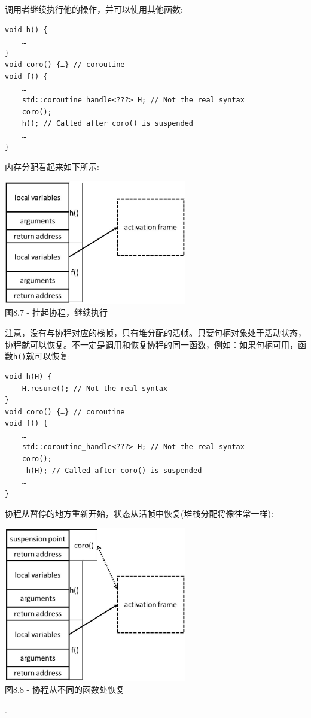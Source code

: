 调用者继续执行他的操作，并可以使用其他函数:

\begin{lstlisting}[style=styleCXX]
void h() {
	…
}
void coro() {…} // coroutine
void f() {
	…
	std::coroutine_handle<???> H; // Not the real syntax
	coro();
	h(); // Called after coro() is suspended
	…
}
\end{lstlisting}

内存分配看起来如下所示:

\begin{center}
\includegraphics[width=0.6\textwidth]{content/2/chapter8/images/7.jpg}\\
图8.7 - 挂起协程，继续执行
\end{center}

注意，没有与协程对应的栈帧，只有堆分配的活帧。只要句柄对象处于活动状态，协程就可以恢复。不一定是调用和恢复协程的同一函数，例如：如果句柄可用，函数\texttt{h()}就可以恢复:

\begin{lstlisting}[style=styleCXX]
void h(H) {
	H.resume(); // Not the real syntax
}
void coro() {…} // coroutine
void f() {
	…
	std::coroutine_handle<???> H; // Not the real syntax
	coro();
	 h(H); // Called after coro() is suspended
	…
}
\end{lstlisting}

协程从暂停的地方重新开始，状态从活帧中恢复(堆栈分配将像往常一样):

\begin{center}
\includegraphics[width=0.6\textwidth]{content/2/chapter8/images/8.jpg}\\
图8.8 - 协程从不同的函数处恢复
\end{center}.

